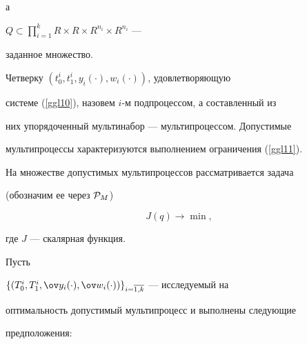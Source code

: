 а


$Q\subset\prod\limits_{i=1}^kR\times R\times R^{n_i}\times R^{n_i}$ ---


заданное множество.





Четверку $(t_0^i,t_1^i,y_i(\cdot),w_i(\cdot))$, удовлетворяющую


системе (\ref{ggl10}), назовем $i$-м подпроцессом, а составленный из


них упорядоченный мультинабор --- мультипроцессом. Допустимые


мультипроцессы характеризуются выполнением ограничения (\ref{ggl11}).


На множестве допустимых мультипроцессов рассматривается задача


(обозначим ее через ${\cal P}_M$)


$$


J(q)\rightarrow \min,


$$


где $J$ --- скалярная функция.





Пусть


$\{(T_0^i,T_1^i,\ov y_i(\cdot),\ov


w_i(\cdot))\}_{i=\overline{1,k}}$ --- исследуемый на


оптимальность допустимый мультипроцесс и выполнены следующие


предположения:


